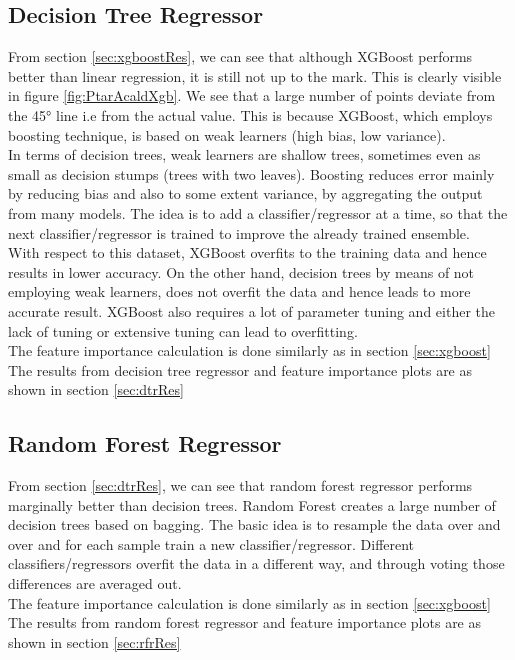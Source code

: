 \documentclass[12pt,chapterheads]{ucsd}
\begin{document}
\subsection{Decision Tree Regressor}
From section \ref{sec:xgboostRes}, we can see that although XGBoost performs better than linear regression, it is still not up to the mark. This is clearly visible in figure \ref{fig:PtarAcaldXgb}. We see that a large number of points deviate from the \ang{45} line i.e from the actual value. This is because XGBoost, which employs boosting technique, is based on weak learners \string(high bias, low variance).\\
In terms of decision trees, weak learners are shallow trees, sometimes even as small as decision stumps (trees with two leaves). Boosting reduces error mainly by reducing bias and also to some extent variance, by aggregating the output from many models. The idea is to add a classifier/regressor at a time, so that the next classifier/regressor is trained to improve the already trained ensemble.\\
With respect to this dataset, XGBoost overfits to the training data and hence results in lower accuracy. On the other hand, decision trees by means of not employing weak learners, does not overfit the data and hence leads to more accurate result. XGBoost also requires a lot of parameter tuning and either the lack of tuning or extensive tuning can lead to overfitting.\\
The feature importance calculation is done similarly as in section \ref{sec:xgboost}\\ The results from decision tree regressor and feature importance plots are as shown in section \ref{sec:dtrRes}


\subsection{Random Forest Regressor}
From section \ref{sec:dtrRes}, we can see that random forest regressor performs marginally better than decision trees.
Random Forest creates a large number of decision trees based on bagging. The basic idea is to resample the data over and over and for each sample train a new classifier/regressor. Different classifiers/regressors overfit the data in a different way, and through voting those differences are averaged out.\\
The feature importance calculation is done similarly as in section \ref{sec:xgboost}\\
The results from random forest regressor and feature importance plots are as shown in section \ref{sec:rfrRes}
\end{document}
